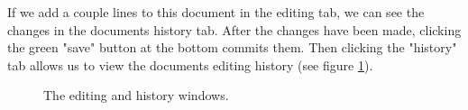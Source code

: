 \documentclass[10pt]{article}
\begin{document}
\begin{flushleft}
If we add a couple lines to this document in the editing tab, we can see the changes in the documents history tab.  After the changes have been made, clicking the green "save" button at the bottom commits them.  Then clicking the "history" tab allows us to view the documents editing history (see figure \ref{edithistory}).
\end{flushleft}

\begin{figure}[H]
    \centering
    \qquad
    \caption{The editing and history windows.}
    \label{edithistory}
\end{figure}
\end{document}
